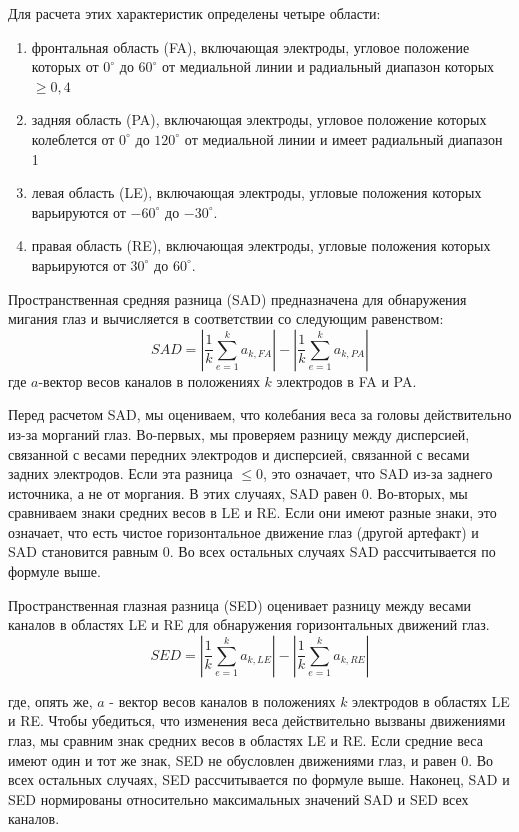 \documentclass[12pt, a4paper, titlepage]{extreport}
\begin{document}
	Для расчета этих характеристик определены четыре области: 
	\begin{enumerate}
		\item фронтальная область (FA), включающая электроды, угловое положение которых от $0^{\circ}$ до $60^{\circ}$ от медиальной линии и радиальный диапазон которых $\ge 0,4$
		\item задняя область (PA), включающая электроды, угловое положение которых колеблется от $0^{\circ}$ до $120^{\circ}$ от медиальной линии и имеет радиальный диапазон 1
		\item левая область (LE), включающая электроды, угловые положения которых варьируются от $-60^{\circ}$ до $-30^{\circ}$.
		\item правая область (RE), включающая электроды, угловые положения которых варьируются от $30^{\circ}$ до $60^{\circ}$.
	\end{enumerate}
	Пространственная средняя разница (SAD) предназначена для обнаружения мигания глаз и вычисляется в соответствии со следующим равенством:
	$$
	SAD = |\frac{1}{k}\sum_{e=1}^{k}a_{k, FA}| - |\frac{1}{k}\sum_{e=1}^{k}a_{k, PA}|
	$$
	где $a$-вектор весов каналов в положениях $k$ электродов в FA и PA.
	
	Перед расчетом SAD, мы оцениваем, что колебания веса за головы действительно из-за морганий глаз. Во-первых, мы проверяем разницу между дисперсией, связанной с весами передних электродов и дисперсией, связанной с весами задних электродов. Если эта разница $\le0$, это означает, что SAD из-за заднего источника, а не от моргания. В этих случаях, SAD равен 0. Во-вторых, мы сравниваем знаки средних весов в LE и RE. Если они имеют разные знаки, это означает, что есть чистое горизонтальное движение глаз (другой артефакт) и SAD становится равным 0. Во всех остальных случаях SAD рассчитывается по формуле выше.
	
	Пространственная глазная разница (SED) оценивает разницу между весами каналов в областях LE и RE для обнаружения горизонтальных движений глаз.
	$$
	SED = |\frac{1}{k}\sum_{e=1}^{k}a_{k, LE}| - |\frac{1}{k}\sum_{e=1}^{k}a_{k, RE}|
	$$
	
	где, опять же, $a$ - вектор весов каналов в положениях $k$ электродов в областях LE и RE. Чтобы убедиться, что изменения веса действительно вызваны движениями глаз, мы сравним знак средних весов в областях LE и RE. Если средние веса имеют один и тот же знак, SED не обусловлен движениями глаз, и равен 0. Во всех остальных случаях, SED рассчитывается по формуле выше. Наконец, SAD и  SED нормированы относительно максимальных значений SAD и SED всех каналов.
	
\end{document}
